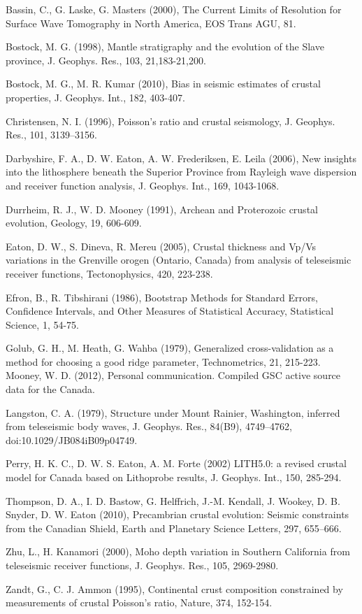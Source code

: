 \documentclass[draft, 12pt]{article}
\begin{document}
\begin{bibliography}
Bassin, C., G. Laske, G. Masters (2000), The Current Limits of Resolution for Surface Wave Tomography in North America, EOS Trans AGU, 81.

Bostock, M. G. (1998), Mantle stratigraphy and the evolution of the Slave province, J. Geophys. Res., 103, 21,183-21,200.

Bostock, M. G., M. R. Kumar (2010), Bias in seismic estimates of crustal properties, J. Geophys. Int., 182, 403-407.

Christensen, N. I. (1996), Poisson's ratio and crustal seismology, J. Geophys. Res., 101, 3139–3156.

Darbyshire, F. A., D. W. Eaton, A. W. Frederiksen, E. Leila (2006), New insights into the lithosphere beneath the Superior Province from Rayleigh wave dispersion and receiver function analysis, J. Geophys. Int., 169, 1043-1068.

Durrheim, R. J., W. D. Mooney (1991), Archean and Proterozoic crustal evolution, Geology, 19, 606-609.

Eaton, D. W., S. Dineva, R. Mereu (2005), Crustal thickness and Vp/Vs variations in the Grenville orogen (Ontario, Canada) from analysis of teleseismic receiver functions, Tectonophysics, 420, 223-238.

Efron, B., R. Tibshirani (1986), Bootstrap Methods for Standard Errors, Confidence Intervals, and Other Measures of Statistical Accuracy, Statistical Science, 1, 54-75.

Golub, G. H., M. Heath, G. Wahba (1979), Generalized cross-validation as a method for choosing a good ridge parameter, Technometrics, 21, 215-223.
Mooney, W. D. (2012), Personal communication. Compiled GSC active source data for the Canada.

Langston, C. A. (1979), Structure under Mount Rainier, Washington, inferred from teleseismic body waves, J. Geophys. Res., 84(B9), 4749–4762, doi:10.1029/JB084iB09p04749.

Perry, H. K. C., D. W. S. Eaton, A. M. Forte (2002) LITH5.0: a revised crustal model for Canada based on Lithoprobe results,  J. Geophys. Int., 150, 285-294.

Thompson, D. A., I. D. Bastow, G. Helffrich, J.-M. Kendall, J. Wookey, D. B. Snyder, D. W. Eaton (2010), Precambrian crustal evolution: Seismic constraints from the Canadian Shield, Earth and Planetary Science Letters, 297, 655–666.

Zhu, L., H. Kanamori (2000), Moho depth variation in Southern California from teleseismic receiver functions, J. Geophys. Res., 105, 2969-2980.

Zandt, G., C. J. Ammon (1995), Continental crust composition constrained by measurements of crustal Poisson's ratio, Nature, 374, 152-154.

\end{bibliography}
\end{document}
